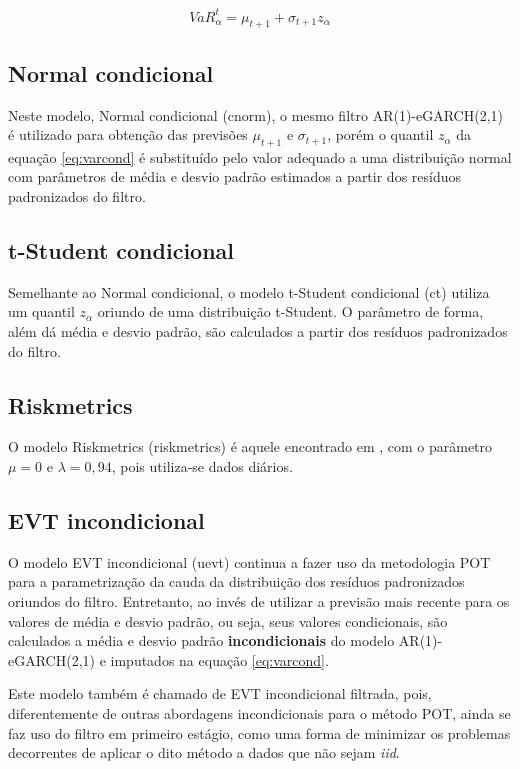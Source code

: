 \documentclass[1p]{elsarticle}
\theoremstyle{definition}
\begin{document}
\begin{equation*}
VaR_\alpha^t=\mu_{t+1}+\sigma_{t+1}z_\alpha 
\end{equation*}

\subsection{Normal condicional}

Neste modelo, Normal condicional (cnorm), o mesmo filtro AR(1)-eGARCH(2,1) é utilizado para obtenção das previsões $\mu_{t+1}$ e $\sigma_{t+1}$, porém o quantil $z_\alpha$ da equação \ref{eq:varcond} é substituído pelo valor adequado a uma distribuição normal com parâmetros de média e desvio padrão estimados a partir dos resíduos padronizados do filtro.

\subsection{t-Student condicional}

Semelhante ao Normal condicional, o modelo t-Student condicional (ct) utiliza um quantil $z_\alpha$ oriundo de uma distribuição t-Student. O parâmetro de forma, além dá média e desvio padrão, são calculados a partir dos resíduos padronizados do filtro.

\subsection{Riskmetrics}

O modelo Riskmetrics (riskmetrics) é aquele encontrado em \cite{RiskMetrics1995}, com o parâmetro $\mu = 0$ e $\lambda = 0,94$, pois utiliza-se dados diários.

\subsection{EVT incondicional}

O modelo EVT incondicional (uevt) continua a fazer uso da metodologia POT para a parametrização da cauda da  distribuição dos resíduos padronizados oriundos do filtro. Entretanto, ao invés de utilizar a previsão mais recente para os valores de média e desvio padrão, ou seja, seus valores condicionais, são calculados a média e desvio padrão \textbf{incondicionais} do modelo AR(1)-eGARCH(2,1) e imputados na equação \ref{eq:varcond}.

Este modelo também é chamado de EVT incondicional filtrada, pois, diferentemente de outras abordagens incondicionais para o método POT, ainda se faz uso do filtro em primeiro estágio, como uma forma de minimizar os problemas decorrentes de aplicar o dito método a dados que não sejam \emph{iid}. 
\end{document}
